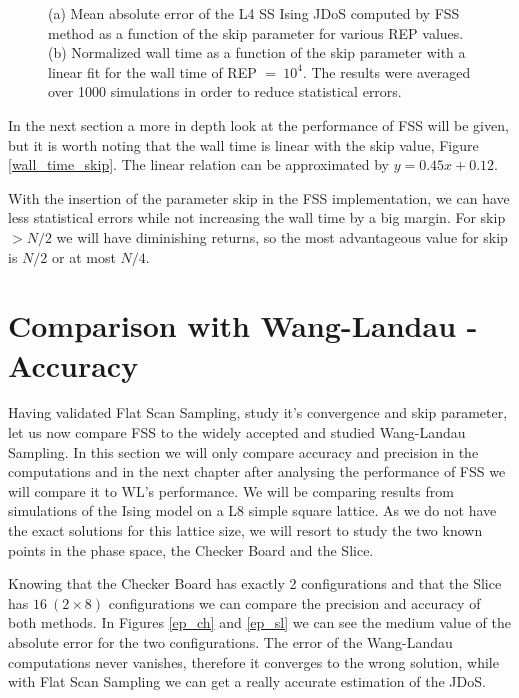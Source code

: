 	\pagebreak

\begin{figure}[h]
	\centering
	\caption{(a) Mean absolute error of the L4 SS Ising JDoS computed by FSS method as a function of the skip parameter for various REP values. (b) Normalized wall time as a function of the skip parameter with a linear fit for the wall time of REP $=\ 10^4$. The results were averaged over 1000 simulations in order to reduce statistical errors.}
\end{figure}

	In the next section a more in depth look at the performance of FSS will be given, but it is worth noting that the wall time is linear with the skip value, Figure \ref{wall_time_skip}. The linear relation can be approximated by $y=0.45x + 0.12$. 
	
	With the insertion of the parameter skip in the FSS implementation, we can have less statistical errors while not increasing the wall time by a big margin. For skip$> N/2$ we will have diminishing returns, so the most advantageous value for skip is $N/2$ or at most $N/4$. 

\section{Comparison with Wang-Landau - Accuracy}

	Having validated Flat Scan Sampling, study it's convergence and skip parameter, let us now compare FSS to the widely accepted and studied Wang-Landau Sampling. In this section we will only compare accuracy and precision in the computations and in the next chapter after analysing the performance of FSS we will compare it to WL's performance. 
	We will be comparing results from simulations of the Ising model on a L8 simple square lattice. As we do not have the exact solutions for this lattice size, we will resort to study the two known points in the phase space, the Checker Board and the Slice. 
	
	Knowing that the Checker Board has exactly 2 configurations and that the Slice has $16\ (2 \times 8)$ configurations we can compare the precision and accuracy of both methods. In Figures \ref{ep_ch} and \ref{ep_sl} we can see the medium value of the absolute error for the two configurations. The error of the Wang-Landau computations never vanishes, therefore it converges to the wrong solution, while with Flat Scan Sampling we can get a really accurate estimation of the JDoS. 
	
